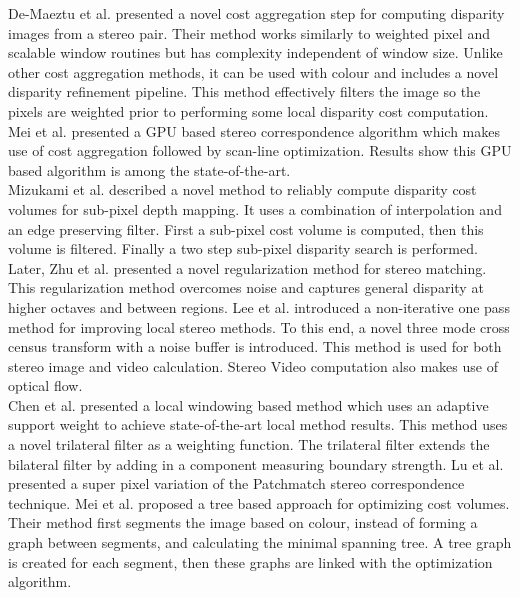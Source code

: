 De-Maeztu et al. \cite{De11Linear} presented a novel cost aggregation step for computing disparity images from a stereo pair. Their method works similarly to weighted pixel and scalable window routines but has complexity independent of window size. Unlike other cost aggregation methods, it can be used with colour and includes a novel disparity refinement pipeline. This method effectively filters the image so the pixels are weighted prior to performing some local disparity cost computation. Mei et al. \cite{Mei11Building} presented a GPU based stereo correspondence algorithm which makes use of cost aggregation followed by scan-line optimization. Results show this GPU based algorithm is among the state-of-the-art. \\


Mizukami et al. \cite{Mizukami12Sub} described a novel method to reliably compute disparity cost volumes for sub-pixel depth mapping. It uses a combination of interpolation and an edge preserving filter. First a sub-pixel cost volume is computed, then this volume is filtered. Finally a two step sub-pixel disparity search is performed. Later, Zhu et al. \cite{Zhu12Locally} presented a novel regularization method for stereo matching. This regularization method overcomes noise and captures general disparity at higher octaves and between regions. Lee et al. \cite{Lee13Local} introduced a non-iterative one pass method for improving local stereo methods. To this end, a novel three mode cross census transform with a noise buffer is introduced. This method is used for both stereo image and video calculation. Stereo Video computation also makes use of optical flow. \\


Chen et al. \cite{Chen13Novel} presented a local windowing based method which uses an adaptive support weight to achieve state-of-the-art local method results. This method uses a novel trilateral filter as a weighting function. The trilateral filter extends the bilateral filter by adding in a component measuring boundary strength. Lu et al. \cite{Lu13Patch} presented a super pixel variation of the Patchmatch stereo correspondence technique. Mei et al. \cite{Mei13Segment} proposed a tree based approach for optimizing cost volumes. Their method first segments the image based on colour, instead of forming a graph between segments, and calculating the minimal spanning tree. A tree graph is created for each segment, then these graphs are linked with the optimization algorithm.\\


